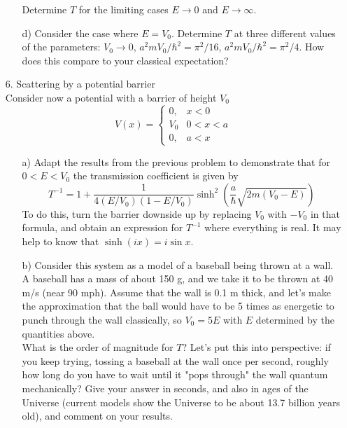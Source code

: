 \documentclass[11pt]{article}
\begin{document}
\begin{itemize}
\begin{itemize}
\begin{displaymath}
\end{displaymath}
Determine $T$ for the limiting cases $E \rightarrow 0$ and $E \rightarrow \infty$.
\item[d)]
Consider the case where $E = V_0$. Determine $T$ at three different values of the parameters:
$V_0 \rightarrow 0$, $a^2mV_0/\hbar^2 = \pi^2/16$, $a^2mV_0/\hbar^2 = \pi^2/4$.
How does this compare to your classical expectation?
\end{itemize}
%
%
\item[6.] Scattering by a potential barrier\\
Consider now a potential with a barrier of height $V_0$
\begin{displaymath}
V(x) =
\begin{cases}
0, &x < 0\\
V_0&0 < x < a\\
0, &a < x
\end{cases}
\end{displaymath}
\begin{itemize}
\item[a)]
Adapt the results from the previous problem to demonstrate that for $0<E<V_0$ the transmission coefficient is given by
\begin{displaymath}
T^{-1} = 1+\frac{1}{4(E/V_0)(1-E/V_0)}\sinh^2\left(\frac{a}{\hbar}\sqrt{2m(V_0-E)}\right)
\end{displaymath}
To do this, turn the barrier downside up by replacing $V_0$ with $-V_0$ in that formula,
and obtain an expression for $T^{-1}$ where everything is real. It may help to know
that $\sinh(ix) = i \sin x$.
\item[b)]
Consider this system as a model of a baseball being thrown at a wall. A baseball has a
mass of about 150 g, and we take it to be thrown at 40 m/s (near 90 mph). Assume that the wall is
0.1 m thick, and let's make the approximation that the ball would have to be 5 times as energetic
to punch through the wall classically, so $V_0 = 5E$ with $E$ determined by the quantities above.\\
What is the order of magnitude for $T$? Let's put this into perspective: if you keep trying, tossing
a baseball at the wall once per second, roughly how long do you have to wait until it "pops through"
the wall quantum mechanically? Give your answer in seconds, and also in ages of the Universe
(current models show the Universe to be about 13.7 billion years old), and comment on your results.
\end{itemize}

\end{itemize}
\end{document}
